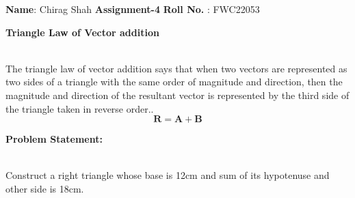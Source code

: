 \documentclass[10pt,a4paper]{report}
\begin{document}
\raggedright \textbf{Name}:\hspace{1mm} Chirag Shah\hspace{3cm} \Large \textbf{Assignment-4}\hspace{2.5cm} %
\normalsize \textbf{Roll No.} :\hspace{1mm} FWC22053\vspace{1cm}
\begin{multicols}{2}

\textbf{Triangle Law of Vector addition }
\vspace{0.5cm}\raggedright \\
The triangle law of vector addition says that when two vectors are represented as two sides of a triangle with the same order of magnitude and direction, then the magnitude and direction of the resultant vector is represented by the third side of the triangle taken in reverse order..\vspace{3mm} \\ 
\begin{equation}
\boldsymbol{R}=\boldsymbol{A}+\boldsymbol{B} 
\end{equation}


\raggedright \textbf{Problem Statement:}\vspace{2mm}
\raggedright \\Construct a right triangle whose base is 12cm and sum of its hypotenuse and other side is 18cm.
\vspace{5mm}


\end{multicols}
\end{document}
